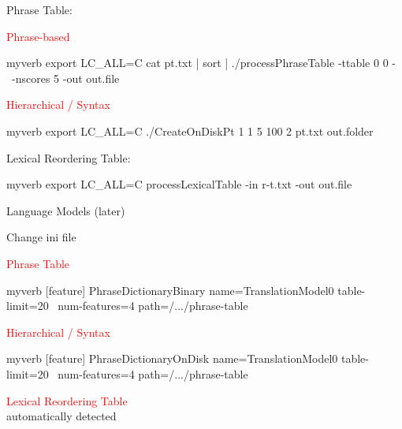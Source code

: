 \documentclass[landscape]{uedslides2C}
\begin{document}

Phrase Table:  
\begin{center}
\textcolor{red}{Phrase-based} \\
\begin{SaveVerbatim}{myverb} 
  export LC_ALL=C
  cat pt.txt | sort | ./processPhraseTable -ttable 0 0 -  \
      -nscores 5 -out out.file
\end{SaveVerbatim}
\colorbox{gray}{}
\end{center}

\begin{center}
\textcolor{red}{Hierarchical / Syntax} \\
\begin{SaveVerbatim}{myverb} 
  export LC_ALL=C
  ./CreateOnDiskPt 1 1 5 100 2 pt.txt out.folder
\end{SaveVerbatim}
\colorbox{gray}{}
\end{center}

Lexical Reordering Table:  
\begin{center}
\begin{SaveVerbatim}{myverb} 
  export LC_ALL=C
  processLexicalTable -in r-t.txt -out out.file
\end{SaveVerbatim}
\colorbox{gray}{}
\end{center}

Language Models (later)



Change ini file \\[-6mm]
\begin{center}
\textcolor{red}{Phrase Table} \\[2mm]
{\small
\begin{SaveVerbatim}{myverb} 
[feature]
PhraseDictionaryBinary name=TranslationModel0 table-limit=20 \ 
   num-features=4 path=/.../phrase-table
\end{SaveVerbatim}
\colorbox{gray}{}
}
\vspace{5mm}

\textcolor{red}{Hierarchical / Syntax} \\[2mm]
{\small
\begin{SaveVerbatim}{myverb} 
[feature]
PhraseDictionaryOnDisk name=TranslationModel0 table-limit=20 \ 
   num-features=4 path=/.../phrase-table
\end{SaveVerbatim}
\colorbox{gray}{\BUseVerbatim{myverb}}
}
\vspace{5mm}

\textcolor{red}{Lexical Reordering Table} \\
automatically detected
\end{center}
\end{document}
